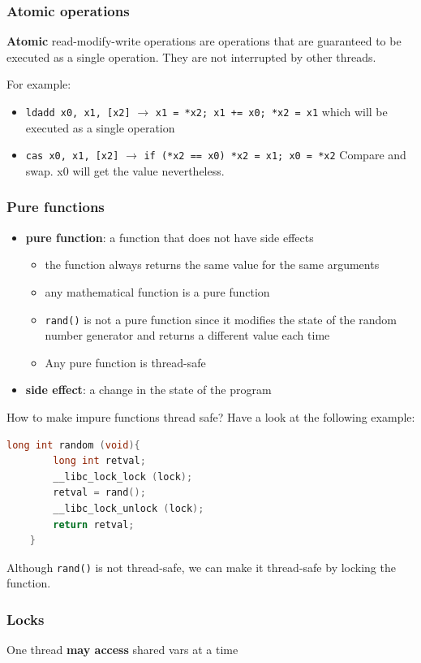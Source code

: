 \documentclass[letterpaper,12pt]{article}
\begin{document}
\subsubsection{Atomic operations}
\textbf{Atomic} read-modify-write operations are operations that are guaranteed to be executed as a single operation. They are not interrupted by other threads. 

For example: \begin{itemize}
    \item \texttt{ldadd x0, x1, [x2]} $\to$ \texttt{x1 = *x2; x1 += x0; *x2 = x1} which will be executed as a single operation
    \item \texttt{cas x0, x1, [x2]} $\to$ \texttt{if (*x2 == x0) *x2 = x1; x0 = *x2} Compare and swap. x0 will get the value nevertheless.
\end{itemize}
\subsubsection{Pure functions}
\begin{itemize}
    \item \textbf{pure function}: a function that does not have side effects\begin{itemize}
        \item the function always returns the same value for the same arguments
        \item any mathematical function is a pure function
        \item \texttt{rand()} is not a pure function since it modifies the state of the random number generator and returns a different value each time
        \item Any pure function is thread-safe
    \end{itemize}
    \item \textbf{side effect}: a change in the state of the program
\end{itemize}
How to make impure functions thread safe? Have a look at the following example:\begin{lstlisting}[language=C]
    long int random (void){
        long int retval;
        __libc_lock_lock (lock);
        retval = rand();
        __libc_lock_unlock (lock);
        return retval;
    }
\end{lstlisting}
Although \texttt{rand()} is not thread-safe, we can make it thread-safe by locking the function.
\subsubsection{Locks}
One thread \textbf{may access} shared vars at a time
\end{document}
